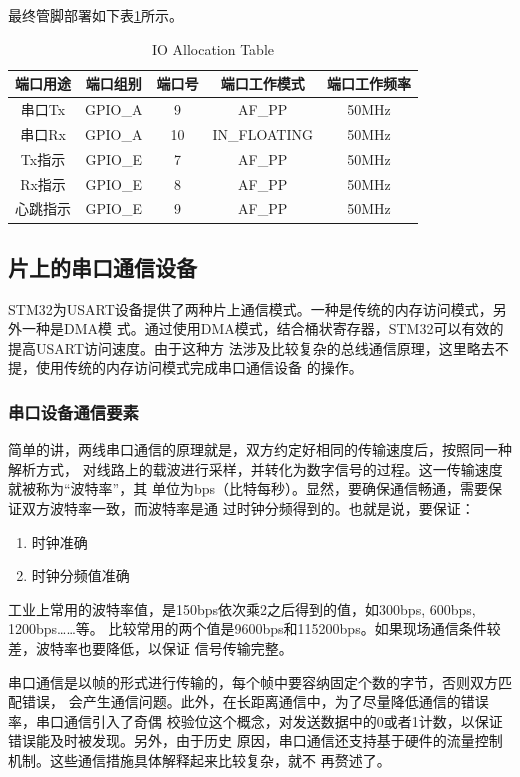 \documentclass[a4paper]{ctexart}
\begin{document}
最终管脚部署如下表\ref{iotable}所示。

\begin{table}[h]
\centering
\caption{IO Allocation Table}
\label{iotable}
\begin{tabular}{|c|c|c|c|c|}
\hline
端口用途 & 端口组别 & 端口号 & 端口工作模式 & 端口工作频率 \\\hline
串口Tx   & GPIO\_A  & 9     & AF\_PP    & 50MHz \\
串口Rx   & GPIO\_A  & 10   & IN\_FLOATING  & 50MHz \\
Tx指示   & GPIO\_E  & 7   & AF\_PP  & 50MHz \\
Rx指示   & GPIO\_E  & 8   & AF\_PP  & 50MHz \\
心跳指示   & GPIO\_E  & 9   & AF\_PP  & 50MHz \\
\hline\end{tabular}\end{table}

\subsection{片上的串口通信设备}

STM32为USART设备提供了两种片上通信模式。一种是传统的内存访问模式，另外一种是DMA模
式。通过使用DMA模式，结合桶状寄存器，STM32可以有效的提高USART访问速度。由于这种方
法涉及比较复杂的总线通信原理，这里略去不提，使用传统的内存访问模式完成串口通信设备
的操作。

\subsubsection{串口设备通信要素}

简单的讲，两线串口通信的原理就是，双方约定好相同的传输速度后，按照同一种解析方式，
对线路上的载波进行采样，并转化为数字信号的过程。这一传输速度就被称为“波特率”，其
单位为bps（比特每秒）。显然，要确保通信畅通，需要保证双方波特率一致，而波特率是通
过时钟分频得到的。也就是说，要保证：

\begin{enumerate}
\item 时钟准确
\item 时钟分频值准确
\end{enumerate}

工业上常用的波特率值，是150bps依次乘2之后得到的值，如300bps, 600bps, 1200bps……等。
比较常用的两个值是9600bps和115200bps。如果现场通信条件较差，波特率也要降低，以保证
信号传输完整。

串口通信是以帧的形式进行传输的，每个帧中要容纳固定个数的字节，否则双方匹配错误，
会产生通信问题。此外，在长距离通信中，为了尽量降低通信的错误率，串口通信引入了奇偶
校验位这个概念，对发送数据中的0或者1计数，以保证错误能及时被发现。另外，由于历史
原因，串口通信还支持基于硬件的流量控制机制。这些通信措施具体解释起来比较复杂，就不
再赘述了。
\end{document}
